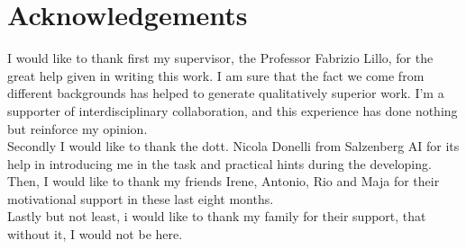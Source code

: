 \documentclass[12pt,a4paper]{book}
\begin{document}
    \chapter*{Acknowledgements}
    I would like to thank first my supervisor, the Professor Fabrizio Lillo, for the great help given in writing this work. I am sure that the fact we come from different backgrounds has helped to generate qualitatively superior work. I'm a supporter of interdisciplinary collaboration, and this experience has done nothing but reinforce my opinion.  \\
    Secondly I would like to thank the dott. Nicola Donelli from Salzenberg AI for its help in introducing me in the task and practical hints during the developing. \\
    Then, I would like to thank my friends Irene, Antonio, Rio and Maja for their motivational support in these last eight months. \\
    Lastly but not least, i would like to thank my family for their support, that without it, I would not be here.
    
    \vfill
\end{document}
